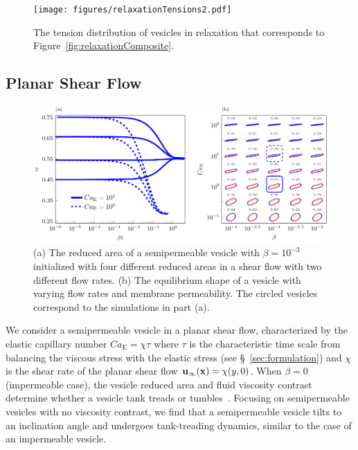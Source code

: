 \documentclass[prb,preprint,showpacs,preprintnumbers,amsmath,amssymb,longbibliography]{revtex4-1}
\newif\ifTikz
\begin{document}
\begin{figure}[htp]
  \centering
  \texttt{[image: figures/relaxationTensions2.pdf]}
%    
  \caption{\label{fig:relaxationTensions} The tension distribution of
  vesicles in relaxation that corresponds to
  Figure~\ref{fig:relaxationComposite}.}
\end{figure}

\subsection{Planar Shear Flow}
\begin{figure}[htp]
  \centering
  \ifTikz
  
  \else
  \includegraphics{figures/shearComposite.pdf}
  \fi
  \caption{\label{fig:shearComposite} (a) The reduced area of a
  semipermeable vesicle with $\beta = 10^{-3}$ initialized with four
  different reduced areas in a shear flow with two different flow rates.
  (b) The equilibrium shape of a vesicle with varying flow rates and
  membrane permeability. The circled vesicles correspond to the
  simulations in part (a).}
\end{figure}

We consider a semipermeable vesicle in a planar shear flow,
characterized by the elastic capillary number $Ca_\mathrm{E}=\chi\tau$ where $\tau$ is the characteristic time scale from balancing the viscous stress with the elastic stress
(see \S~\ref{sec:formulation}) and $\chi$ is the shear rate of the planar
shear flow $\mathbf{u}_{\infty}(\mathbf{x}) = \chi (y,0)$.  When $\beta=0$
(impermeable case), the vesicle reduced area and fluid viscosity
contrast determine whether a vesicle tank treads or
tumbles~\cite{fin-lam-sei-gom2008, kra-win-sei-lip1996}. Focusing on
semipermeable vesicles with no viscosity contrast, we find that a
semipermeable vesicle tilts to an inclination angle and undergoes
tank-treading dynamics, similar to the case of an impermeable vesicle.
\end{document}
